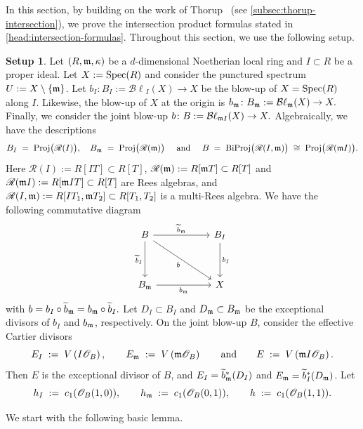 \documentclass[a4paper, 11pt]{amsart}
\newcommand{\Bl}{{\mathcal{B}\ell}}
\newcommand{\mm}{{\normalfont\mathfrak{m}}}
\newcommand{\Rees}{\mathscr{R}}
\newcommand{\OO}{\mathscr{O}}
\newcommand{\Proj}{\normalfont\text{Proj}}
\newcommand{\Spec}{\normalfont\text{Spec}}
\newcommand{\biProj}{{\normalfont\text{BiProj}}}
\newcommand{\wt}{\widetilde}
\theoremstyle{definition}
\newtheorem{setup}[setup]{Setup}
\begin{document}
	
	In this section, by building on the work of Thorup~\cite{Thorup} (see \autoref{subsec:thorup-intersection}), we prove the intersection product formulas stated in \autoref{head:intersection-formulas}.
	Throughout this section, we use the following setup.	
	
	\begin{setup}
		\label{setup_general}
		Let $(R,\mm,\kappa)$ be a $d$-dimensional Noetherian local ring and
		$I\subset R$ be a proper ideal.
		Let $X:=\Spec(R)$ and consider the punctured spectrum $U := X \setminus \{\mm\}$.
		Let
		$
		b_I\colon B_I:=\Bl_I(X)\rightarrow X
		$
		be the blow-up of $X=\Spec(R)$ along $I$. 
		Likewise, the blow-up of $X$ at the origin is
		$
		b_\mm\colon B_\mm:=\Bl_{\mm}(X)\rightarrow X.
		$
		Finally, we consider the joint blow-up
		$
		b\colon B:=\Bl_{\mm I}(X)\rightarrow X.
		$
		Algebraically, we have the descriptions 
		$$
		B_I \;=\; \Proj\big(\Rees(I)\big), \quad  B_\mm \;=\; \Proj\big(\Rees(\mm)\big) \quad \text{ and } \quad B \;=\; \biProj\big(\Rees(I, \mm)\big) \;\cong\; \Proj\big(\Rees(\mm I)\big).
		$$
		Here $\Rees(I) := R[IT] \subset R[T]$, $\Rees(\mm) := R[\mm T] \subset R[T]$ and $\Rees(\mm I) := R[\mm IT] \subset R[T]$ are Rees algebras, and $\Rees(I, \mm) := R[IT_1, \mm T_2] \subset R[T_1, T_2]$ is a multi-Rees algebra. 
		We have the following commutative diagram
		$$
		\begin{tikzcd}[column sep=5.5em, row sep=3.5em]
			B \arrow[r, "\wt b_\mm"] \arrow[d, "\wt b_I"'] \arrow[rd, "b"']
			& B_I \arrow[d, "b_I"] \\
			B_\mm \arrow[r, "b_\mm"']
			& X
		\end{tikzcd}
		$$
		with
		$
		b=b_I\circ \wt b_\mm=b_\mm\circ \wt b_I.
		$
		Let $D_I\subset B_I$ and $D_\mm\subset B_\mm$ be the exceptional divisors of $b_I$ and $b_\mm$, respectively. 
		On the
		joint blow-up $B$, consider the effective Cartier divisors
		$$
		E_I \;:=\; V\left(I \OO_B\right),\qquad E_\mm \;:=\; V\left(\mm \OO_B\right) \qquad \text{and}\qquad E \;:=\; V\left(\mm I \OO_B\right).
		$$
		Then $E$ is the exceptional divisor of $B$, and $E_I=\wt{b}_\mm^*(D_I)$ and $E_\mm=\wt{b}_I^*(D_\mm)$.
		Let
		$$
		h_I \;:=\; c_1(\mathscr O_{B}(1, 0)),
		\qquad
		h_\mm \;:=\; c_1(\mathscr O_{B}(0, 1)),
		\qquad
		h \;:=\; c_1(\mathscr O_B(1,1)).
		$$
	\end{setup}	
	
	We start with the following basic lemma. 
	
\end{document}
